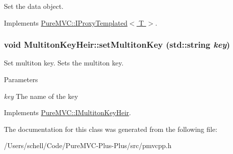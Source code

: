 Set the data object. 

Implements \hyperlink{class_pure_m_v_c_1_1_i_proxy_templated_aef201c3df1efc6c2652f5de3ba0fff74}{PureMVC::IProxyTemplated$<$ T $>$}.\hypertarget{class_pure_m_v_c_1_1_multiton_key_heir_abc70ef7c066bc8d7bf0196ec727599bb}{
\subsubsection[{setMultitonKey}]{\setlength{\rightskip}{0pt plus 5cm}void MultitonKeyHeir::setMultitonKey (std::string {\em key})}}
\label{class_pure_m_v_c_1_1_multiton_key_heir_abc70ef7c066bc8d7bf0196ec727599bb}


Set multiton key. Sets the multiton key. 
\begin{DoxyParams}{Parameters}
\item[{\em key}]The name of the key \end{DoxyParams}


Implements \hyperlink{class_pure_m_v_c_1_1_i_multiton_key_heir_a03acb75ab79defba2c28b8de1bbe1ca6}{PureMVC::IMultitonKeyHeir}.

The documentation for this class was generated from the following file:\begin{DoxyCompactItemize}
\item 
/Users/schell/Code/PureMVC-\/Plus-\/Plus/src/pmvcpp.h\end{DoxyCompactItemize}
